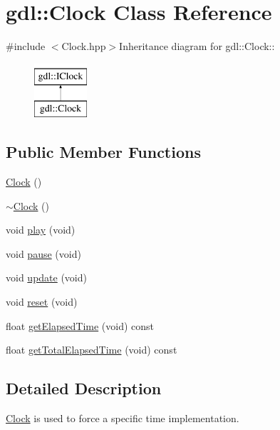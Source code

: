 \hypertarget{classgdl_1_1Clock}{
\section{gdl::Clock Class Reference}
\label{classgdl_1_1Clock}
}


{\ttfamily \#include $<$Clock.hpp$>$}Inheritance diagram for gdl::Clock::\begin{figure}[H]
\begin{center}
\leavevmode
\includegraphics[height=2cm]{classgdl_1_1Clock}
\end{center}
\end{figure}
\subsection*{Public Member Functions}
\begin{DoxyCompactItemize}
\item 
\hyperlink{classgdl_1_1Clock_aab3b54f0e335efd7136e8a2900da9c3e}{Clock} ()
\item 
\hyperlink{classgdl_1_1Clock_a54c8e0862b5903056d169195c0b22072}{$\sim$Clock} ()
\item 
void \hyperlink{classgdl_1_1Clock_af1054a354823d2556a780ddec710e368}{play} (void)
\item 
void \hyperlink{classgdl_1_1Clock_afcd4590e0217065f7f2c9bd13cb6c3ad}{pause} (void)
\item 
void \hyperlink{classgdl_1_1Clock_acc748cbe2dc79ab94c7843e2f010d049}{update} (void)
\item 
void \hyperlink{classgdl_1_1Clock_a9a44b0217d50c216d2e94d0f174e3a67}{reset} (void)
\item 
float \hyperlink{classgdl_1_1Clock_a3b81a05f6b9d4af46b6c955017c8ddfd}{getElapsedTime} (void) const 
\item 
float \hyperlink{classgdl_1_1Clock_a1c7cb8d2c1c742db97cb667c2cfe5552}{getTotalElapsedTime} (void) const 
\end{DoxyCompactItemize}


\subsection{Detailed Description}
\hyperlink{classgdl_1_1Clock}{Clock} is used to force a specific time implementation. 

